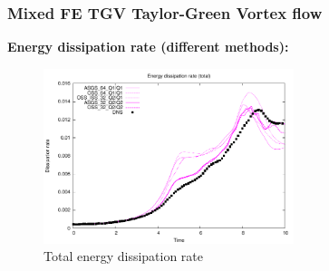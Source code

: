 \begin{frame}
 \frametitle{Mixed FE TGV {\small Taylor-Green Vortex flow}}
 \textbf{Energy dissipation rate (different methods):}
 \vspace*{-0.3cm}
   \begin{figure}
     \centering	
     \includegraphics[width=0.65\textwidth]{Figures/oss_64_tot.pdf}
     \vspace*{-0.3cm}
     \caption{Total energy dissipation rate}
   \end{figure}
 \begin{overlayarea}{\textwidth}{1.5cm}
  \end{overlayarea}
\end{frame}
